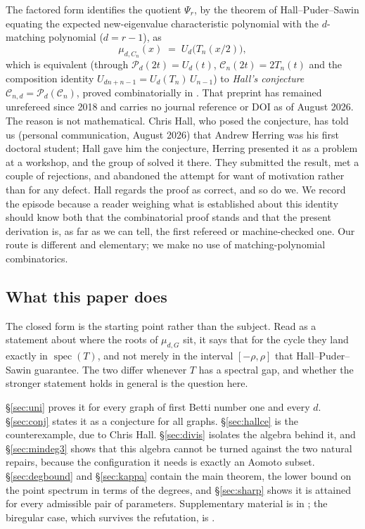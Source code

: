 \documentclass[11pt]{article}
\theoremstyle{remark}
\begin{document}
The factored form identifies the quotient $\Psi_r$, by the theorem of
Hall--Puder--Sawin \cite{HPS} equating the expected new-eigenvalue
characteristic polynomial with the $d$-matching polynomial ($d=r-1$), as
\[
\mu_{d,C_n}(x)\;=\;U_{d}\bigl(T_n(x/2)\bigr),
\]
which is equivalent (through $\mathcal P_d(2t)=U_d(t)$, $\mathcal
C_n(2t)=2T_n(t)$ and the composition identity
$U_{dn+n-1}=U_d(T_n)\,U_{n-1}$) to \emph{Hall's conjecture}
$\mathcal C_{n,d}=\mathcal P_d(\mathcal C_n)$, proved combinatorially in \cite{CGHRS}.
That preprint has remained unrefereed since 2018 and carries no journal reference or
DOI as of August 2026. The reason is not mathematical. Chris Hall, who posed the
conjecture, has told us (personal communication, August 2026) that Andrew Herring was his
first doctoral student; Hall gave him the conjecture, Herring presented it as a problem at
a workshop, and the group of \cite{CGHRS} solved it there. They submitted the result, met
a couple of rejections, and abandoned the attempt for want of motivation rather than for
any defect. Hall regards the proof as correct, and so do we. We record the episode because
a reader weighing what is established about this identity should know both that the
combinatorial proof stands and that the present derivation is, as far as we can tell, the
first refereed or machine-checked one.
Our route is different and elementary; we make no use of matching-polynomial
combinatorics.









\subsection*{What this paper does}

The closed form is the starting point rather than the subject. Read as a statement about where the
roots of $\mu_{d,G}$ sit, it says that for the cycle they land exactly in
$\operatorname{spec}(T)$, and not merely in the interval $[-\rho,\rho]$ that Hall--Puder--Sawin
guarantee. The two differ whenever $T$ has a spectral gap, and whether the stronger statement holds
in general is the question here.

\S\ref{sec:uni} proves it for every graph of first Betti number one and every $d$.
\S\ref{sec:conj} states it as a conjecture for all graphs. \S\ref{sec:hallce} is the counterexample,
due to Chris Hall. \S\ref{sec:divis} isolates the algebra behind it, and \S\ref{sec:mindeg3} shows
that this algebra cannot be turned against the two natural repairs, because the configuration it
needs is exactly an Aomoto subset. \S\ref{sec:degbound} and \S\ref{sec:kappa} contain the main
theorem, the lower bound on the point spectrum in terms of the degrees, and \S\ref{sec:sharp}
shows it is attained for every admissible pair of parameters. Supplementary material is in \cite{Supp}; the biregular case,
which survives the refutation, is \cite{PartII}.
\end{document}
